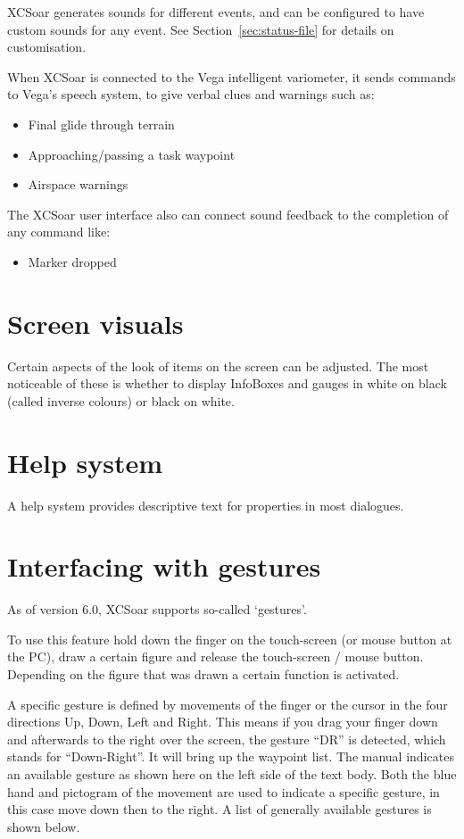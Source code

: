 XCSoar generates sounds for different events, and can be configured to
have custom sounds for any event.  See Section~\ref{sec:status-file} for
details on customisation.

When XCSoar is connected to the Vega intelligent variometer, it sends
commands to Vega's speech system, to give verbal clues and warnings such as:
\begin{itemize}
\item Final glide through terrain
\item Approaching/passing a task waypoint
\item Airspace warnings
\end{itemize}

The XCSoar user interface also can connect sound feedback to the completion 
of any command like:
\begin{itemize}
\item Marker dropped
\end{itemize}


\section{Screen visuals}

Certain aspects of the look of items on the screen can be adjusted.
The most noticeable of these is whether to display InfoBoxes and
gauges in white on black (called inverse colours) or black on white.


\section{Help system}

A help system provides descriptive text for properties in most
dialogues.

\section{Interfacing with gestures}\label{sec:gestures}
As of version 6.0, XCSoar supports so-called `gestures'.

To use this feature hold down the finger on the 
touch-screen (or mouse button at the PC), draw a certain figure and release 
the touch-screen / mouse button. Depending on the figure that was drawn 
a certain function is activated. 

A specific gesture is defined by movements of the finger or the 
cursor in the four directions Up, Down, Left and Right. This means if 
you drag your finger down and afterwards to the right over the screen, 
 the gesture ``DR'' is detected, which stands for ``Down-Right''.
It will bring up the waypoint list. The manual indicates an available 
gesture as shown here on the left side of the text body. Both the blue hand 
and pictogram of the movement are used to indicate a specific gesture, in this 
case move down then to the right. A list of generally available gestures is 
shown below. 
\vspace{2em}

